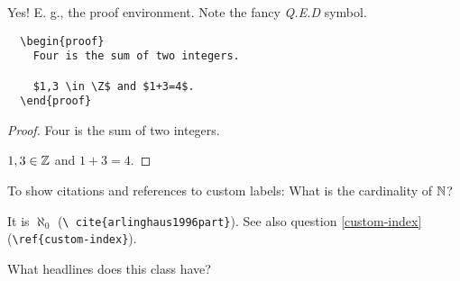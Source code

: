 \documentclass{homework}
\newcommand{\bk}{\textbackslash}
\renewcommand\tt[1]{\texttt{#1}}
\begin{document}
\begin{sol}
  Yes! E. g., the proof environment. Note the fancy \textit{Q.E.D} symbol.

  \vspace*{1em}
  \begin{minipage}{0.45\textwidth}
    \begin{verbatim}
  \begin{proof}
    Four is the sum of two integers.

    $1,3 \in \Z$ and $1+3=4$.
  \end{proof}
    \end{verbatim}
  \end{minipage}
  \hfill
  \begin{minipage}{0.45\textwidth} \hspace{1.9em}
    \begin{proof}
      Four is the sum of two integers.

      $1,3 \in \mathbb{Z}$ and $1+3=4$.
    \end{proof}
  \end{minipage}
\end{sol}

\question\label{cardinality} To show citations and references to
custom labels: What is the cardinality of $\mathbb{N}$?

\begin{sol}
  It is $\aleph_0$ \cite{arlinghaus1996part} (\tt{\bk
    cite\{arlinghaus1996part\}}). See also question \ref{custom-index}
  (\tt{\bk ref\{custom-index\}}).
\end{sol}

\question What headlines does this class have?
\end{document}
